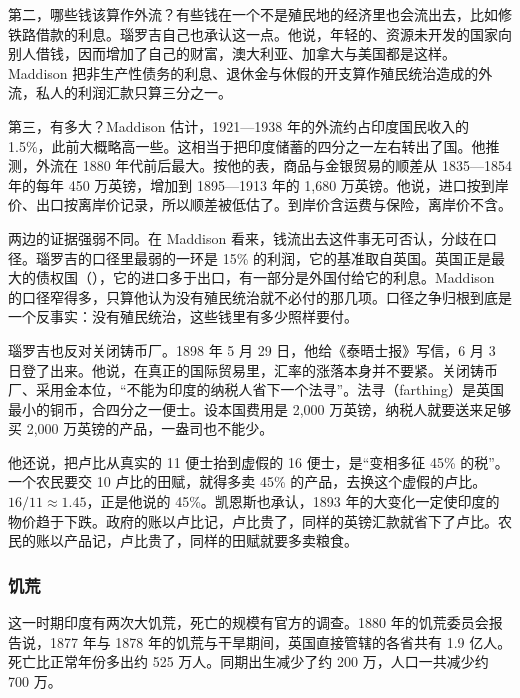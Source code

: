 第二，哪些钱该算作外流？有些钱在一个不是殖民地的经济里也会流出去，比如修铁路借款的利息\cite{maddison1971}。瑙罗吉自己也承认这一点。他说，年轻的、资源未开发的国家向别人借钱，因而增加了自己的财富，澳大利亚、加拿大与美国都是这样\cite{naoroji1901}。Maddison 把非生产性债务的利息、退休金与休假的开支算作殖民统治造成的外流，私人的利润汇款只算三分之一\cite{maddison1971}。

第三，有多大？Maddison 估计，1921—1938 年的外流约占印度国民收入的 1.5\%，此前大概略高一些\cite{maddison1971}。这相当于把印度储蓄的四分之一左右转出了国\cite{maddison1971}。他推测，外流在 1880 年代前后最大\cite{maddison1971}。按他的表，商品与金银贸易的顺差从 1835—1854 年的每年 450 万英镑，增加到 1895—1913 年的 1,680 万英镑\cite{maddison1971}。他说，进口按到岸价、出口按离岸价记录，所以顺差被低估了\cite{maddison1971}。到岸价含运费与保险，离岸价不含。

两边的证据强弱不同。在 Maddison 看来，钱流出去这件事无可否认，分歧在口径。瑙罗吉的口径里最弱的一环是 15\% 的利润，它的基准取自英国。英国正是最大的债权国（），它的进口多于出口，有一部分是外国付给它的利息。Maddison 的口径窄得多，只算他认为没有殖民统治就不必付的那几项。口径之争归根到底是一个反事实：没有殖民统治，这些钱里有多少照样要付。

瑙罗吉也反对关闭铸币厂。1898 年 5 月 29 日，他给《泰晤士报》写信，6 月 3 日登了出来\cite{naoroji1901}。他说，在真正的国际贸易里，汇率的涨落本身并不要紧\cite{naoroji1901}。关闭铸币厂、采用金本位，“不能为印度的纳税人省下一个法寻”\cite{naoroji1901}。法寻（farthing）是英国最小的铜币，合四分之一便士。设本国费用是 2,000 万英镑，纳税人就要送来足够买 2,000 万英镑的产品，一盎司也不能少\cite{naoroji1901}。

他还说，把卢比从真实的 11 便士抬到虚假的 16 便士，是“变相多征 45\% 的税”\cite{naoroji1901}。一个农民要交 10 卢比的田赋，就得多卖 45\% 的产品，去换这个虚假的卢比\cite{naoroji1901}。$16/11\approx1.45$，正是他说的 45\%。凯恩斯也承认，1893 年的大变化一定使印度的物价趋于下跌\cite{keynes1913}。政府的账以卢比记，卢比贵了，同样的英镑汇款就省下了卢比。农民的账以产品记，卢比贵了，同样的田赋就要多卖粮食。

\subsubsection{饥荒}
这一时期印度有两次大饥荒，死亡的规模有官方的调查。1880 年的饥荒委员会报告说，1877 年与 1878 年的饥荒与干旱期间，英国直接管辖的各省共有 1.9 亿人\cite{famine1880}。死亡比正常年份多出约 525 万人\cite{famine1880}。同期出生减少了约 200 万，人口一共减少约 700 万\cite{famine1880}。

